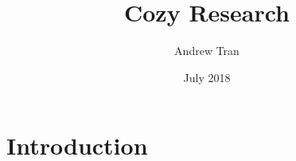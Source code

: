 \documentclass[12pt]{article}
\title{Cozy Research}
\author{Andrew Tran}
\date{July 2018}
\begin{document}
\maketitle

\section{Introduction}
\end{document}
